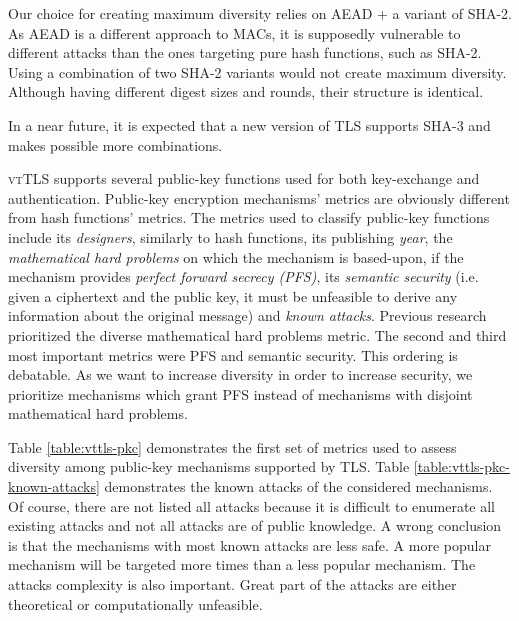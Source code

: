 \documentclass{sig-alternate-05-2015}
\begin{document}
Our choice for creating maximum diversity relies on AEAD + a variant of SHA-2. As AEAD is a different approach to MACs, it is supposedly vulnerable to different attacks than the ones targeting pure hash functions, such as SHA-2.
Using a combination of two SHA-2 variants would not create maximum diversity. Although having different digest sizes and rounds, their structure is identical.

In a near future, it is expected that a new version of TLS supports SHA-3 and makes possible more combinations.


\textsc{vtTLS} supports several public-key functions used for both key-exchange and authentication. Public-key encryption mechanisms' metrics are obviously different from hash functions' metrics. 
The metrics used to classify public-key functions include its \textit{designers}, similarly to hash functions, its publishing \textit{year}, the \textit{mathematical hard problems} on which the mechanism is based-upon, if the mechanism provides \textit{perfect forward secrecy (PFS)}, its \textit{semantic security} (i.e. given a ciphertext and the public key, it must be unfeasible to derive any information about the original message) and \textit{known attacks}. Previous research prioritized the diverse mathematical hard problems metric. The second and third most important metrics were PFS and semantic security.
This ordering is debatable. As we want to increase diversity in order to increase security, we prioritize mechanisms which grant PFS instead of mechanisms with disjoint mathematical hard problems.

Table \ref{table:vttls-pkc} demonstrates the first set of metrics used to assess diversity among public-key mechanisms supported by TLS. Table \ref{table:vttls-pkc-known-attacks} demonstrates the known attacks of the considered mechanisms. Of course, there are not listed all attacks because it is difficult to enumerate all existing attacks and not all attacks are of public knowledge. A wrong conclusion is that the mechanisms with most known attacks are less safe. A more popular mechanism will be targeted more times than a less popular mechanism. The attacks complexity is also important. Great part of the attacks are either theoretical or computationally unfeasible.
\end{document}
